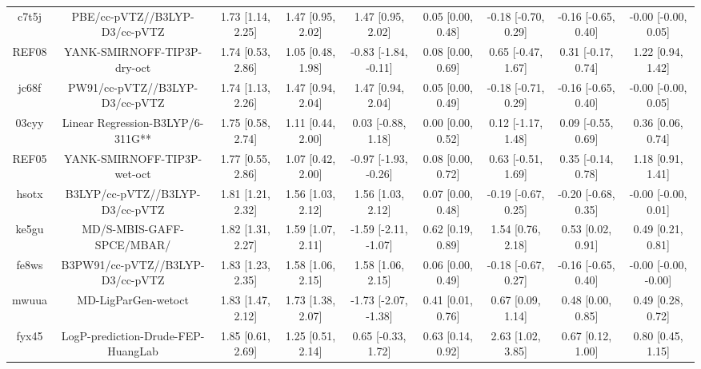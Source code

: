 \documentclass{article}
\begin{document}
\begin{center}
\begin{longtable}{|ccccccccc|}
 c7t5j &                      PBE/cc-pVTZ//B3LYP-D3/cc-pVTZ &  1.73 [1.14, 2.25] &  1.47 [0.95, 2.02] &     1.47 [0.95, 2.02] &  0.05 [0.00, 0.48] &  -0.18 [-0.70, 0.29] &  -0.16 [-0.65, 0.40] &   -0.00 [-0.00, 0.05] \\
 REF08 &                        YANK-SMIRNOFF-TIP3P-dry-oct &  1.74 [0.53, 2.86] &  1.05 [0.48, 1.98] &  -0.83 [-1.84, -0.11] &  0.08 [0.00, 0.69] &   0.65 [-0.47, 1.67] &   0.31 [-0.17, 0.74] &     1.22 [0.94, 1.42] \\
 jc68f &                     PW91/cc-pVTZ//B3LYP-D3/cc-pVTZ &  1.74 [1.13, 2.26] &  1.47 [0.94, 2.04] &     1.47 [0.94, 2.04] &  0.05 [0.00, 0.49] &  -0.18 [-0.71, 0.29] &  -0.16 [-0.65, 0.40] &   -0.00 [-0.00, 0.05] \\
 03cyy &                   Linear Regression-B3LYP/6-311G** &  1.75 [0.58, 2.74] &  1.11 [0.44, 2.00] &    0.03 [-0.88, 1.18] &  0.00 [0.00, 0.52] &   0.12 [-1.17, 1.48] &   0.09 [-0.55, 0.69] &     0.36 [0.06, 0.74] \\
 REF05 &                        YANK-SMIRNOFF-TIP3P-wet-oct &  1.77 [0.55, 2.86] &  1.07 [0.42, 2.00] &  -0.97 [-1.93, -0.26] &  0.08 [0.00, 0.72] &   0.63 [-0.51, 1.69] &   0.35 [-0.14, 0.78] &     1.18 [0.91, 1.41] \\
 hsotx &                    B3LYP/cc-pVTZ//B3LYP-D3/cc-pVTZ &  1.81 [1.21, 2.32] &  1.56 [1.03, 2.12] &     1.56 [1.03, 2.12] &  0.07 [0.00, 0.48] &  -0.19 [-0.67, 0.25] &  -0.20 [-0.68, 0.35] &   -0.00 [-0.00, 0.01] \\
 ke5gu &                          MD/S-MBIS-GAFF-SPCE/MBAR/ &  1.82 [1.31, 2.27] &  1.59 [1.07, 2.11] &  -1.59 [-2.11, -1.07] &  0.62 [0.19, 0.89] &    1.54 [0.76, 2.18] &    0.53 [0.02, 0.91] &     0.49 [0.21, 0.81] \\
 fe8ws &                   B3PW91/cc-pVTZ//B3LYP-D3/cc-pVTZ &  1.83 [1.23, 2.35] &  1.58 [1.06, 2.15] &     1.58 [1.06, 2.15] &  0.06 [0.00, 0.49] &  -0.18 [-0.67, 0.27] &  -0.16 [-0.65, 0.40] &  -0.00 [-0.00, -0.00] \\
 mwuua &                                MD-LigParGen-wetoct &  1.83 [1.47, 2.12] &  1.73 [1.38, 2.07] &  -1.73 [-2.07, -1.38] &  0.41 [0.01, 0.76] &    0.67 [0.09, 1.14] &    0.48 [0.00, 0.85] &     0.49 [0.28, 0.72] \\
 fyx45 &                 LogP-prediction-Drude-FEP-HuangLab &  1.85 [0.61, 2.69] &  1.25 [0.51, 2.14] &    0.65 [-0.33, 1.72] &  0.63 [0.14, 0.92] &    2.63 [1.02, 3.85] &    0.67 [0.12, 1.00] &     0.80 [0.45, 1.15] \\

\end{longtable}
\end{center}
\end{document}
